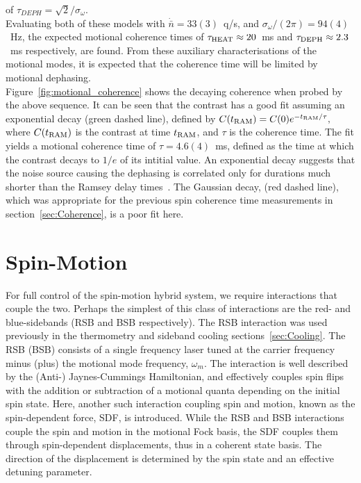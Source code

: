     of $\tau_{DEPH} = \sqrt{2}/\sigma_{\omega}$.\\
    Evaluating both of these models with $\dot{\bar{n}}=33(3)$~q/s, and
    $\sigma_{\omega}/(2\pi) = 94(4)$~\unit{\Hz}, the expected motional coherence times of $\tau_{\rm
    HEAT} \approx 20$~ms and $\tau_{\rm DEPH} \approx 2.3$~ms respectively, are found. From these auxiliary characterisations of the motional modes, it is expected that the coherence time will be limited by motional dephasing. \\
    Figure~\ref{fig:motional_coherence} shows the decaying coherence when probed by the above sequence. It can be seen that the contrast has a good fit assuming an exponential decay (green dashed line),
    defined by $C(t_{\rm RAM}) = C(0) e^{-t_{\rm RAM}/\tau},$ where $C(t_{\rm RAM})$ is the contrast at time $t_{\rm RAM}$, and $\tau$ is the coherence time. The fit yields a motional coherence time of $\tau = 4.6(4)$~\unit{\ms}, defined as the time at which the contrast decays to $1/e$ of its intitial value. 
    An exponential decay suggests that the noise source causing the dephasing is correlated only for durations much shorter than the Ramsey delay times~\cite{omalley2015qubit}.
    The Gaussian decay, (red dashed line), which was appropriate for the previous spin coherence time measurements in section~\ref{sec:Coherence}, is a poor fit here. \\
    
    



\section{Spin-Motion}
    For full control of the spin-motion hybrid system, we require interactions
    that couple the two. Perhaps the simplest of this class of interactions
    are the red- and blue-sidebands (RSB and BSB respectively). The  RSB
    interaction was used previously in the thermometry and sideband cooling
    sections~\ref{sec:Cooling}. The RSB (BSB) consists of a single frequency
    laser tuned at the carrier frequency minus (plus) the motional mode frequency,
    $\omega_m$. The interaction is well described by the (Anti-) Jaynes-Cummings
    Hamiltonian, and effectively couples spin flips with the addition or
    subtraction of a motional quanta depending on the initial spin state. Here,
    another such interaction coupling spin and motion, known as the
    spin-dependent force, SDF, is introduced. 
    While the RSB and BSB interactions couple the spin and motion in the motional Fock basis, the SDF couples them through spin-dependent displacements, thus in a coherent state basis. The direction of the displacement is determined by the spin state and an effective detuning parameter.

